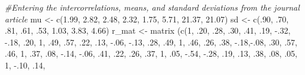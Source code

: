 \documentclass[
  11pt,
]{book}
\newenvironment{Shaded}{\begin{snugshade}}{\end{snugshade}}
\newcommand{\CommentTok}[1]{\textcolor[rgb]{0.56,0.35,0.01}{\textit{#1}}}
\newcommand{\DecValTok}[1]{\textcolor[rgb]{0.00,0.00,0.81}{#1}}
\newcommand{\FloatTok}[1]{\textcolor[rgb]{0.00,0.00,0.81}{#1}}
\newcommand{\FunctionTok}[1]{\textcolor[rgb]{0.00,0.00,0.00}{#1}}
\newcommand{\NormalTok}[1]{#1}
\newcommand{\OtherTok}[1]{\textcolor[rgb]{0.56,0.35,0.01}{#1}}
\newcommand{\SpecialCharTok}[1]{\textcolor[rgb]{0.00,0.00,0.00}{#1}}
\begin{document}
\begin{Shaded}
\begin{Highlighting}[]
\CommentTok{\#Entering the intercorrelations, means, and standard deviations from the journal article}
\NormalTok{mu }\OtherTok{\textless{}{-}} \FunctionTok{c}\NormalTok{(}\FloatTok{1.99}\NormalTok{, }\FloatTok{2.82}\NormalTok{, }\FloatTok{2.48}\NormalTok{, }\FloatTok{2.32}\NormalTok{, }\FloatTok{1.75}\NormalTok{, }\FloatTok{5.71}\NormalTok{, }\FloatTok{21.37}\NormalTok{, }\FloatTok{21.07}\NormalTok{)}
\NormalTok{sd }\OtherTok{\textless{}{-}} \FunctionTok{c}\NormalTok{(.}\DecValTok{90}\NormalTok{, .}\DecValTok{70}\NormalTok{, .}\DecValTok{81}\NormalTok{, .}\DecValTok{61}\NormalTok{, .}\DecValTok{53}\NormalTok{, }\FloatTok{1.03}\NormalTok{, }\FloatTok{3.83}\NormalTok{, }\FloatTok{4.66}\NormalTok{)}
\NormalTok{r\_mat }\OtherTok{\textless{}{-}} \FunctionTok{matrix}\NormalTok{ (}\FunctionTok{c}\NormalTok{(}\DecValTok{1}\NormalTok{, .}\DecValTok{20}\NormalTok{, .}\DecValTok{28}\NormalTok{, .}\DecValTok{30}\NormalTok{, .}\DecValTok{41}\NormalTok{, .}\DecValTok{19}\NormalTok{, }\SpecialCharTok{{-}}\NormalTok{.}\DecValTok{32}\NormalTok{, }\SpecialCharTok{{-}}\NormalTok{.}\DecValTok{18}\NormalTok{,}
\NormalTok{        .}\DecValTok{20}\NormalTok{, }\DecValTok{1}\NormalTok{, .}\DecValTok{49}\NormalTok{, .}\DecValTok{57}\NormalTok{, .}\DecValTok{22}\NormalTok{, .}\DecValTok{13}\NormalTok{, }\SpecialCharTok{{-}}\NormalTok{.}\DecValTok{06}\NormalTok{, }\SpecialCharTok{{-}}\NormalTok{.}\DecValTok{13}\NormalTok{,}
\NormalTok{        .}\DecValTok{28}\NormalTok{, .}\DecValTok{49}\NormalTok{, }\DecValTok{1}\NormalTok{, .}\DecValTok{46}\NormalTok{, .}\DecValTok{26}\NormalTok{, .}\DecValTok{38}\NormalTok{, }\SpecialCharTok{{-}}\NormalTok{.}\DecValTok{18}\NormalTok{,}\SpecialCharTok{{-}}\NormalTok{.}\DecValTok{08}\NormalTok{, }
\NormalTok{        .}\DecValTok{30}\NormalTok{, .}\DecValTok{57}\NormalTok{, .}\DecValTok{46}\NormalTok{,  }\DecValTok{1}\NormalTok{, .}\DecValTok{37}\NormalTok{, .}\DecValTok{08}\NormalTok{, }\SpecialCharTok{{-}}\NormalTok{.}\DecValTok{14}\NormalTok{, }\SpecialCharTok{{-}}\NormalTok{.}\DecValTok{06}\NormalTok{,}
\NormalTok{        .}\DecValTok{41}\NormalTok{, .}\DecValTok{22}\NormalTok{, .}\DecValTok{26}\NormalTok{, .}\DecValTok{37}\NormalTok{, }\DecValTok{1}\NormalTok{, .}\DecValTok{05}\NormalTok{, }\SpecialCharTok{{-}}\NormalTok{.}\DecValTok{54}\NormalTok{, }\SpecialCharTok{{-}}\NormalTok{.}\DecValTok{28}\NormalTok{, }
\NormalTok{        .}\DecValTok{19}\NormalTok{, .}\DecValTok{13}\NormalTok{, .}\DecValTok{38}\NormalTok{, .}\DecValTok{08}\NormalTok{, .}\DecValTok{05}\NormalTok{, }\DecValTok{1}\NormalTok{, }\SpecialCharTok{{-}}\NormalTok{.}\DecValTok{10}\NormalTok{, .}\DecValTok{14}\NormalTok{, }

\end{Highlighting}
\end{Shaded}
\end{document}
